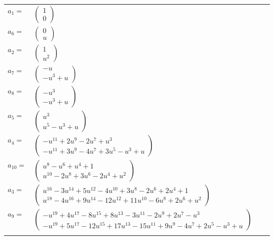 \documentclass[1p]{elsarticle_modified}
\theoremstyle{definition}
\begin{document}
\begin{tabular}{m{7pt} m{180pt} m{7pt} m{180pt} }
\flushright $a_{1}=$&$\begin{pmatrix}1\\0\end{pmatrix}$ \\
\flushright $a_{6}=$&$\begin{pmatrix}0\\u\end{pmatrix}$ \\
\flushright $a_{2}=$&$\begin{pmatrix}1\\u^2\end{pmatrix}$ \\
\flushright $a_{7}=$&$\begin{pmatrix}- u\\- u^3+u\end{pmatrix}$ \\
\flushright $a_{8}=$&$\begin{pmatrix}- u^3\\- u^3+u\end{pmatrix}$ \\
\flushright $a_{5}=$&$\begin{pmatrix}u^3\\u^5- u^3+u\end{pmatrix}$ \\
\flushright $a_{4}=$&$\begin{pmatrix}- u^{11}+2 u^9-2 u^7+u^3\\- u^{11}+3 u^9-4 u^7+3 u^5- u^3+u\end{pmatrix}$ \\
\flushright $a_{10}=$&$\begin{pmatrix}u^8- u^6+u^4+1\\u^{10}-2 u^8+3 u^6-2 u^4+u^2\end{pmatrix}$ \\
\flushright $a_{3}=$&$\begin{pmatrix}u^{16}-3 u^{14}+5 u^{12}-4 u^{10}+3 u^8-2 u^6+2 u^4+1\\u^{18}-4 u^{16}+9 u^{14}-12 u^{12}+11 u^{10}-6 u^8+2 u^6+u^2\end{pmatrix}$ \\
\flushright $a_{9}=$&$\begin{pmatrix}- u^{19}+4 u^{17}-8 u^{15}+8 u^{13}-3 u^{11}-2 u^9+2 u^7- u^3\\- u^{19}+5 u^{17}-12 u^{15}+17 u^{13}-15 u^{11}+9 u^9-4 u^7+2 u^5- u^3+u\end{pmatrix}$\\&\end{tabular}
\end{document}
